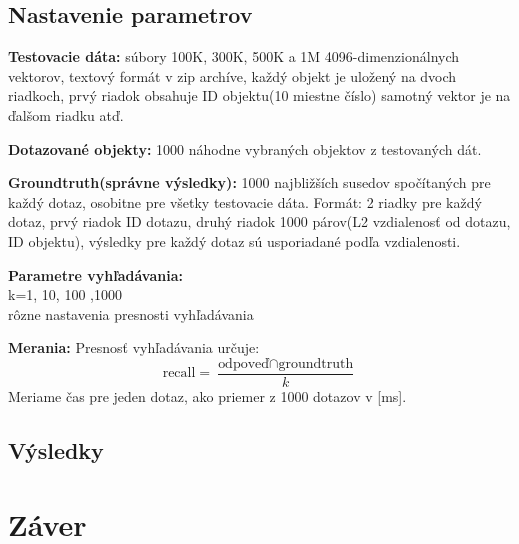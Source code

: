 \documentclass[12pt,a4paper,oneside]{fithesis2}
\begin{document}
\section{Nastavenie parametrov}
\begin{description}

\item \textbf{Testovacie dáta:} súbory 100K, 300K, 500K a 1M 4096-dimenzionálnych vektorov, textový formát v zip archíve, každý objekt je uložený na dvoch riadkoch, prvý riadok obsahuje ID objektu(10 miestne číslo) samotný vektor je na ďalšom riadku atď.

\item \textbf{Dotazované objekty:} 1000 náhodne vybraných objektov z testovaných dát. 

\item \textbf{Groundtruth(správne výsledky):} 1000 najbližších susedov spočítaných pre každý dotaz, osobitne pre všetky testovacie dáta. Formát: 2 riadky pre každý dotaz, prvý riadok ID dotazu, druhý riadok 1000 párov(L2 vzdialenosť od dotazu, ID objektu), výsledky pre každý dotaz sú usporiadané podľa vzdialenosti.

\item \textbf{Parametre vyhľadávania:} \\
k=1, 10, 100 ,1000 \\
rôzne nastavenia presnosti vyhľadávania \\

\item \textbf{Merania:}
Presnosť vyhľadávania určuje: 
\begin{equation*}
\textrm{recall} =  \frac{ \textrm{odpoveď} \cap \textrm{groundtruth}}{k}
\end{equation*}
Meriame čas pre jeden dotaz, ako priemer z 1000 dotazov v [ms].

\item 
\end{description}


\section{Výsledky}
    \chapter{Záver}
    

{}

\end{document}

